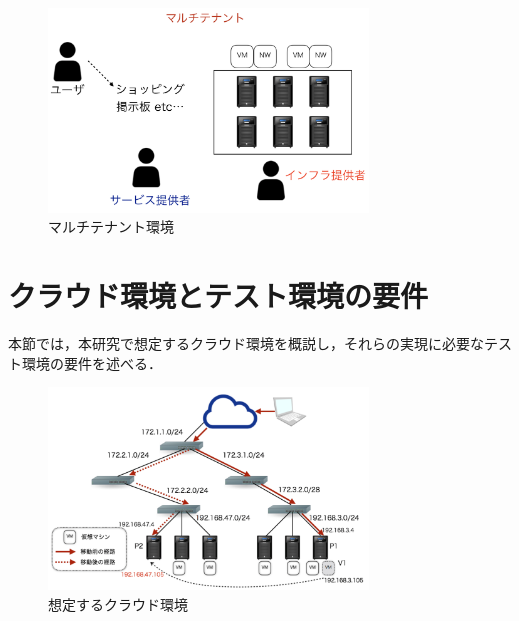 \documentclass[submit,techrep]{ipsj}
\begin{document}
\begin{figure}[tb]
	\includegraphics[width=8.5cm,bb=0 0 752 480]{fig/user.png}
	\caption{マルチテナント環境}
	\label{fig:user}
\end{figure}

\section{クラウド環境とテスト環境の要件}
本節では，本研究で想定するクラウド環境を概説し，それらの実現に必要なテスト環境の要件を述べる．
\begin{figure}[tb]
	\includegraphics[width=8.5cm,bb=0 0 579 366]{fig/cloud.png}
	\caption{想定するクラウド環境}
	\label{fig:cloud}
\end{figure}
\end{document}

